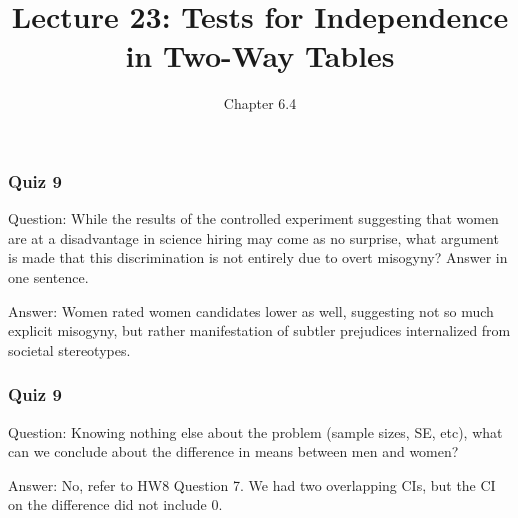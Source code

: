 \documentclass[handout]{beamer}
\title{Lecture 23: Tests for Independence in Two-Way Tables}
\author{Chapter 6.4}
\date{}
\newcommand{\blue}[1]{\textcolor{blue2}{#1}}
\begin{document}
\begin{frame}
\titlepage
\end{frame}


\begin{frame}
\frametitle{Quiz 9}

\blue{Question}:  While the results of the controlled experiment suggesting that women are at a disadvantage in science hiring may come as no surprise, what argument is made that this discrimination is not entirely due to overt misogyny?  Answer in one sentence.

\vspace{0.5cm}

\pause \blue{Answer}: Women rated women candidates lower as well, suggesting not so much explicit misogyny, but rather manifestation of subtler prejudices internalized from societal stereotypes.

\end{frame}


\begin{frame}
\frametitle{Quiz 9}

\blue{Question}:  Knowing nothing else about the problem (sample sizes, SE, etc), what can we conclude about the difference in means between men and women?

\vspace{0.5cm}

\pause\blue{Answer}: No, refer to HW8 Question 7.  We had two overlapping CIs, but the CI on the difference did not include 0.

\end{frame}


%
%
%
\end{document}
